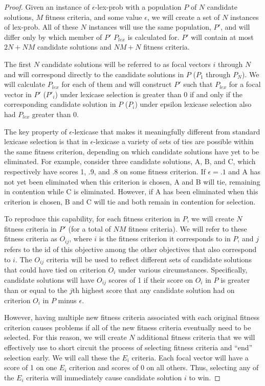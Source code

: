 \documentclass[sigconf]{acmart}
\begin{document}
\begin{proof}

Given an instance of {\sc $\epsilon$-lex-prob} with a population $P$ of $N$ candidate solutions, $M$ fitness criteria, and some value $\epsilon$, we will create a set of $N$ instances of {\sc lex-prob}. All of these $N$ instances will use the same population, $P'$, and will differ only by which member of $P'$ $P_{lex}$ is calculated for. $P'$ will contain at most $2N + NM$ candidate solutions and $NM + N$ fitness criteria. 

The first $N$ candidate solutions will be referred to as focal vectors $i$ through $N$ and will correspond directly to the candidate solutions in $P$ ($P_1$ through $P_N$). We will calculate $P_{lex}$ for each of them and will construct $P'$ such that $P_{lex}$ for a focal vector in $P'$ ($P'_i$) under lexicase selection is greater than 0 if and only if the corresponding candidate solution in $P$ ($P_i$) under epsilon lexicase selection also had $P_{lex}$ greater than 0. 

The key property of $\epsilon$-lexicase that makes it meaningfully different from standard lexicase selection is that in $\epsilon$-lexicase a variety of sets of ties are possible within the same fitness criterion, depending on which candidate solutions have yet to be eliminated. For example, consider three candidate solutions, A, B, and C, which respectively have scores 1, .9, and .8 on some fitness criterion. If $\epsilon=.1$ and A has not yet been eliminated when this criterion is chosen, A and B will tie, remaining in contention while C is eliminated. However, if A has been eliminated when this criterion is chosen, B and C will tie and both remain in contention for selection. 

To reproduce this capability, for each fitness criterion in $P$, we will create $N$ fitness criteria in $P'$ (for a total of $NM$ fitness criteria). We will refer to these fitness criteria as $O_{ij}$, where $i$ is the fitness criterion it corresponds to in $P$, and $j$ refers to the id of this objective among the other objectives that also correspond to $i$. The $O_{ij}$ criteria will be used to reflect different sets of candidate solutions that could have tied on criterion $O_i$ under various circumstances. Specifically, candidate solutions will have $O_{ij}$ scores of 1 if their score on $O_i$ in $P$ is greater than or equal to the $j$th highest score that any candidate solution had on criterion $O_i$ in $P$ minus $\epsilon$.

However, having multiple new fitness criteria associated with each original fitness criterion causes problems if all of the new fitness criteria eventually need to be selected. For this reason, we will create $N$ additional fitness criteria that we will effectively use to short circuit the process of selecting fitness criteria and ``end'' selection early. We will call these the $E_i$ criteria. Each focal vector will have a score of 1 on one $E_i$ criterion and scores of 0 on all others. Thus, selecting any of the $E_i$ criteria will immediately cause candidate solution $i$ to win.


\end{proof}
\end{document}
